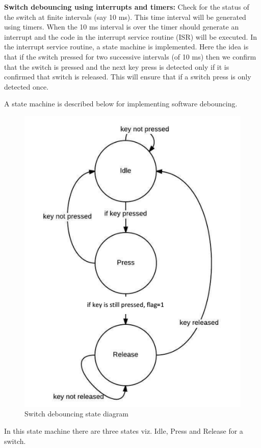 \documentclass[a4paper,12pt,oneside]{book}
\begin{document}
\textbf{Switch debouncing using interrupts and timers:} Check for the status of the switch at finite intervals (say 10 ms). This time interval will be generated using timers. When the 10 ms interval is over the timer should generate an interrupt and the code in the interrupt service routine (ISR) will be executed. In the interrupt service routine, a state machine is implemented. Here the idea is that if the switch pressed for two successive intervals (of 10 ms) then we confirm that the switch is pressed and the next key press is detected only if it is confirmed that switch is released. This will ensure that if a switch press is only detected once. 

A state machine is described below for implementing software debouncing. 
\begin{figure}
\centering
\includegraphics[scale=0.8]{stateChart.png}
\caption{Switch debouncing state diagram}
\label{sm}
\end{figure}
In this state machine there are three states viz. Idle, Press and Release for a switch.
\end{document}
